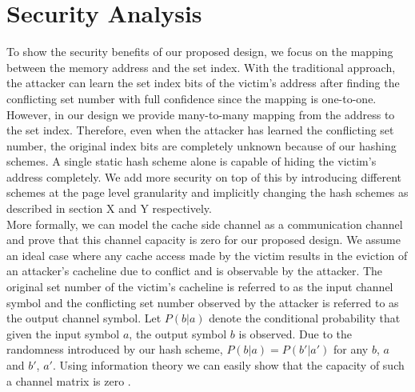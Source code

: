 \section{Security Analysis}
To show the security benefits of our proposed design, we focus on the mapping between the memory address and the set index. With the traditional approach, the attacker can learn the set index bits of the victim's address after finding the conflicting set number with full confidence since the mapping is one-to-one. However, in our design we provide many-to-many mapping from the address to the set index. Therefore, even when the attacker has learned the conflicting set number, the original index bits are completely unknown because of our hashing schemes. A single static hash scheme alone is capable of hiding the victim's address completely. We add more security on top of this by introducing different schemes at the page level granularity and implicitly changing the hash schemes as described in section X and Y respectively. \\
More formally, we can model the cache side channel as a communication channel and prove that this channel capacity is zero for our proposed design. We assume an ideal case where any cache access made by the victim results in the eviction of an attacker's cacheline due to conflict and is observable by the attacker. The original set number of the victim's cacheline is referred to as the input channel symbol and the conflicting set number observed by the attacker is referred to as the output channel symbol. Let $P(b|a)$ denote the conditional probability that given the input symbol $a$, the output symbol $b$ is observed. Due to the randomness introduced by our hash scheme, $P(b|a) = P(b'|a')$ for any $b$, $a$ and $b'$, $a'$. Using information theory we can easily show that the capacity of such a channel matrix is zero \cite{info_theory}.

